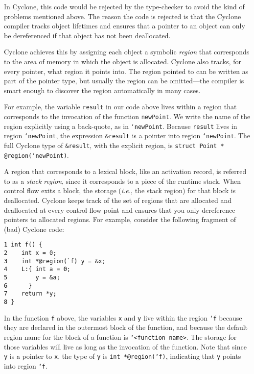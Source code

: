 In Cyclone, this code would be rejected by the type-checker to avoid
the kind of problems mentioned above.  The reason the code is rejected
is that the Cyclone compiler tracks object lifetimes and ensures that
a pointer to an object can only be dereferenced if that object 
has not been deallocated.  

Cyclone achieves this by assigning each object a symbolic
\emph{region} that corresponds to the area of memory in which the
object is allocated.  Cyclone also tracks, for every pointer, what
region it points into.  The region pointed to can be written as part
of the pointer type, but usually the region can be omitted---the
compiler is smart enough to discover the region automatically in many
cases.

For example, the variable \texttt{result} in our code above lives
within a region that corresponds to the invocation of the function
\texttt{newPoint}.  We write the name of the region explicitly using a
back-quote, as in \texttt{`newPoint}.  Because \texttt{result} lives
in region \texttt{`newPoint}, the expression \texttt{\&result} is a
pointer into region \texttt{`newPoint}.  The full Cyclone type of
\texttt{\&result}, with the explicit region, is \texttt{struct Point
* @region(`newPoint)}.

A region that corresponds to a lexical block, like an activation
record, is referred to as a \emph{stack region}, since it corresponds
to a piece of the runtime stack.
When control flow exits a block, the storage (\emph{i.e.}, 
the stack region) for that 
block is deallocated.  Cyclone keeps track of the set of regions that
are allocated and deallocated at every control-flow point and ensures
that you only dereference pointers to allocated regions.  For example,
consider the following fragment of (bad) Cyclone code:
\begin{verbatim}
1 int f() {
2    int x = 0;
3    int *@region(`f) y = &x;
4    L:{ int a = 0;
5        y = &a;
6      }
7    return *y;
8 }
\end{verbatim}
In the function \texttt{f} above, the variables \texttt{x} and 
\texttt{y} live within the region \texttt{`f} because they are
declared in the outermost block of the function, and because
the default region name for the block of a function is
\texttt{`<function name>}.  
The storage for
those variables will live as long as the invocation of the function.
Note that since \texttt{y} is a pointer to \texttt{x}, the type of
\texttt{y} is \texttt{int *@region(`f)}, indicating that \texttt{y} 
points into region \texttt{`f}.

